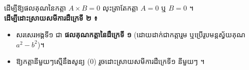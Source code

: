 \documentclass[theme=teal]{khmermath}
\newcommand{\koreahl}[1]{\colorbox{koreaYellow}{\fontsize{8.5}{8.5}\selectfont\textbf{#1}}}
\begin{document}
\begin{khboxorange}[title={\fontsize{9}{9}\selectfont\kml\color{white}\ding{72}\ លក្ខណៈផលគុណនៃកត្តាស្មើនឹងសូន្យ}]
  ដើម្បីឱ្យផលគុណនៃកត្តា \koreahl{$A \times B = 0$} លុះត្រាតែកត្តា \koreahl{$A = 0$} ឬ \koreahl{$B = 0$} ។\\
  \textbf{ដើម្បីដោះស្រាយសមីការដឺក្រេទី ២ ៖}
  \begin{itemize}[leftmargin=16pt, itemsep=1.5pt, topsep=1pt, parsep=0pt]
    \item[\color{brandNavy}\ding{228}] សរសេរអង្គទី១ ជា \koreahl{ផលគុណកត្តានៃដឺក្រេទី ១} (ដោយដាក់ជាកត្តារួម ឬប្រើរូបមន្តស្វ័យគុណ $a^2-b^2$)។
    \item[\color{brandNavy}\ding{228}] ឱ្យកត្តានីមួយៗស្មើនឹងសូន្យ ($0$) រួចដោះស្រាយសមីការដឺក្រេទី១ នីមួយៗ ។
  \end{itemize}
\end{khboxorange}
\end{document}
